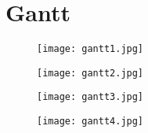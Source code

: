 \section{Gantt} 
\label{sec:PlanungGantt} 
\begin{landscape} 
	\begin{figure}[tb] 
		\centering 
		\texttt{[image: gantt1.jpg]} 
		\label{fig:planunggantt1} 
	\end{figure} 

	\begin{figure}[tb] 
		\centering 
		\texttt{[image: gantt2.jpg]} 
		\label{fig:planunggantt2} 
	\end{figure} 

	\begin{figure}[tb] 
		\centering 
		\texttt{[image: gantt3.jpg]} 
		\label{fig:planunggantt3} 
	\end{figure}
	 
	\begin{figure}[tb] 
		\centering 
		\texttt{[image: gantt4.jpg]} 
		\label{fig:planunggantt4} 
	\end{figure}
\end{landscape}

